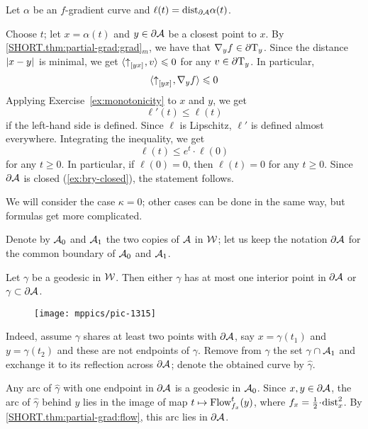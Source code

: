 Let $\alpha$ be an $f$-gradient curve and $\ell(t)=\mathrm{dist}_{\partial \mathcal{A}}\alpha(t)$.

Choose $t$;
let $x=\alpha(t)$ and $y\in \partial\mathcal{A}$ be a closest point to $x$.
By \ref{SHORT.thm:partial-grad:grad}$_m$, we have that $\nabla_y f\in\partial \mathrm{T}_y$.
Since the distance $|{x}-{y}|_{}^{{}}$ is minimal, 
we get $\langle {\uparrow}_{[{y}{x}]_{{}}},v\rangle\leqslant 0$ for any $v\in \partial \mathrm{T}_y$.
In particular,
\[\langle {\uparrow}_{[{y}{x}]_{{}}},\nabla_y f\rangle\leqslant 0\]
Applying Exercise~\ref{ex:monotonicity} to $x$ and $y$, 
we get
\[\ell'(t)\le \ell(t)\]
if the left-hand side is defined.
Since $\ell$ is Lipschitz, $\ell'$ is defined almost everywhere.
Integrating the inequality, we get 
\[\ell(t)\le e^t\cdot\ell(0)\]
for any $t\ge 0$.
In particular, if $\ell(0)=0$, then $\ell(t)=0$ for any $t\ge 0$.
Since $\partial\mathcal{A}$ is closed (\ref{ex:bry-closed}), the statement follows.

We will consider the case $\kappa=0$;
other cases can be done in the same way, but formulas get more complicated.

Denote by $\mathcal{A}_0$ and $\mathcal{A}_1$ the two copies of $\mathcal{A}$ in $\mathcal{W}$;
let us keep the notation $\partial \mathcal{A}$ for the common boundary of $\mathcal{A}_0$ and $\mathcal{A}_1$.

\begin{clm}{}
Let $\gamma$ be a geodesic in $\mathcal{W}$.
Then either $\gamma$ has at most one interior point in $\partial \mathcal{A}$ or
$\gamma\subset \partial \mathcal{A}$.
\end{clm}

\begin{wrapfigure}{r}{45mm}
\vskip-2mm
\centering
\texttt{[image: mppics/pic-1315]}
\end{wrapfigure}

Indeed, assume $\gamma$ shares at least two points with $\partial \mathcal{A}$, say $x=\gamma(t_1)$ and $y=\gamma(t_2)$ and these are not endpoints of $\gamma$.
Remove from $\gamma$ the set $\gamma\cap \mathcal{A}_1$
and exchange it to its reflection across $\partial\mathcal{A}$;
denote the obtained curve by $\hat\gamma$.

Any arc of $\hat\gamma$ with one endpoint in $\partial \mathcal{A}$
is a geodesic in $\mathcal{A}_0$.
Since $x,y\in \partial \mathcal{A}$, the arc of $\hat\gamma$ behind $y$ lies in the image of map $t\mapsto \mathop{\rm Flow}\nolimits^t_{f_x}(y)$, where $f_x=\tfrac12\cdot\distfun^2_x$.
By \ref{SHORT.thm:partial-grad:flow}, this arc lies in $\partial\mathcal{A}$.

